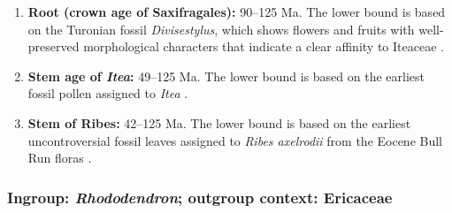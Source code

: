 \begin{enumerate}
\item \textbf{Root (crown age of Saxifragales):} 90--125 Ma. The lower
  bound is based on the Turonian fossil \textit{Divisestylus}, which
  shows flowers and fruits with well-preserved morphological
  characters that indicate a clear affinity to Iteaceae
  \citep{Hermsen2003}.

\item \textbf{Stem age of \textit{Itea}:} 49--125 Ma. The lower
  bound is based on the earliest fossil pollen assigned to \emph{Itea}
  \citep{Hermsen2013}.

\item \textbf{Stem of Ribes:} 42--125 Ma. The lower bound is based
  on the earliest uncontroversial fossil leaves assigned to
  \textit{Ribes axelrodii} from the Eocene Bull Run floras
  \citep{Hermsen2005}.
\end{enumerate}

\subsubsection*{Ingroup: \textit{Rhododendron}; outgroup context: Ericaceae}


